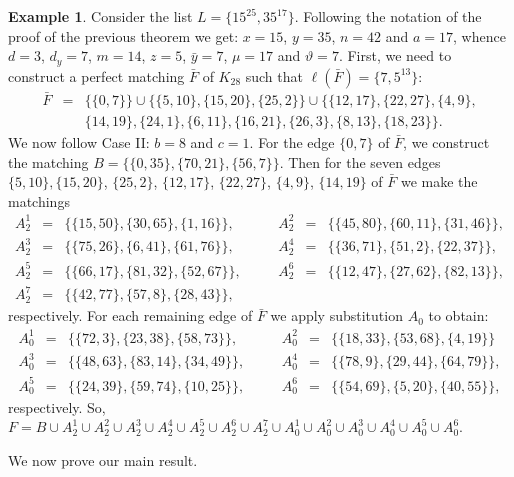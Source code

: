 \documentclass{amsart}
\theoremstyle{definition}
\newtheorem{ex}[defi]{Example}
\numberwithin{equation}{section}
\begin{document}
\begin{ex}
Consider the list $L=\{15^{25},35^{17}\}$. Following the notation of the proof of the previous theorem we get:
$x=15$, $y=35$, $n=42$ and $a=17$, whence $d=3$, $d_y=7$, $m=14$, $z=5$, $\bar y =7$, $\mu=17$
and $\vartheta= 7$.
First, we need to construct a perfect matching $\bar F$ of $K_{28}$ such that $\ell(\bar F)=\{7, 5^{13} \}$:
$$\begin{array}{rcl}
\bar F & =& \{\{0,7 \}\}\cup \{\{5, 10\},\{15,20\},\{25,2\} \}
\cup \{\{ 12, 17\},\{  22, 27\},\{4, 9 \},\\
&& \{ 14, 19 \},\{24, 1\},\{ 6, 11\},\{ 16, 21\},\{26, 3 \},\{ 8, 13 \},\{18, 23 \} \}.
  \end{array}$$
We now follow Case II: $b=8$ and $c=1$.
For the edge $\{0,7\}$ of $\bar F$, we construct the matching 
$B=\{\{0, 35 \}, \{ 70, 21 \}, \{ 56, 7 \}   \}$.
Then for the seven edges $\{5, 10\},\{15,20\}$, $\{25,2\}$, $\{ 12, 17\}$, $\{  22, 27\}$, 
$\{4, 9 \}$, $\{ 14, 19 \}$ of $\bar F$ we make the matchings 
$$\begin{array}{rclcrcl}
A_2^1 & = & \{\{ 15, 50\}, \{30, 65 \}, \{ 1, 16 \}\}, & \quad & 
A_2^2 & =& \{\{ 45, 80\}, \{60, 11 \},  \{ 31, 46 \}\}, \\
A_2^3 & =& \{\{  75, 26\}, \{6, 41 \}, \{ 61, 76 \}\}, && 
A_2^4 & = & \{ \{ 36, 71\}, \{51, 2 \}, \{ 22, 37 \}\},\\
A_2^5 & =& \{\{ 66, 17\}, \{ 81, 32 \}, \{ 52, 67 \}\}, && 
A_2^6 & =& \{ \{ 12, 47\}, \{27, 62 \}, \{ 82, 13 \}\},\\
A_2^7 & =& \{ \{42, 77\}, \{57, 8 \}, \{ 28, 43 \}\}, 
\end{array}$$
respectively. 
For each remaining edge of $\bar F$ we apply substitution
$A_0$ to obtain:
$$\begin{array}{rclcrcl}
A_0^1 & =& \{\{ 72, 3 \},\{ 23, 38 \},\{58, 73\}\}, & \quad & 
A_0^2 & =& \{ \{ 18, 33 \},\{ 53, 68 \},\{ 4, 19 \}\}\\
A_0^3 & = &\{\{ 48, 63 \},\{ 83, 14\},\{ 34, 49 \}\},&&
A_0^4 & =& \{\{  78, 9 \},\{ 29, 44 \},\{64, 79 \}\}, \\
A_0^5 & =& \{\{ 24, 39 \},\{ 59, 74 \},\{ 10, 25 \}\},&&
A_0^6 & =& \{\{ 54, 69 \},\{ 5, 20 \},\{ 40, 55 \}\},
  \end{array}$$
respectively.
So, $F=B\cup A_2^1\cup A_2^2\cup A_2^3\cup A_2^4\cup A_2^5\cup A_2^6\cup A_2^7\cup  
A_0^1\cup A_0^2\cup A_0^3\cup A_0^4 \cup A_0^5\cup A_0^6$.
\end{ex}


We now prove our main result.
\end{document}
